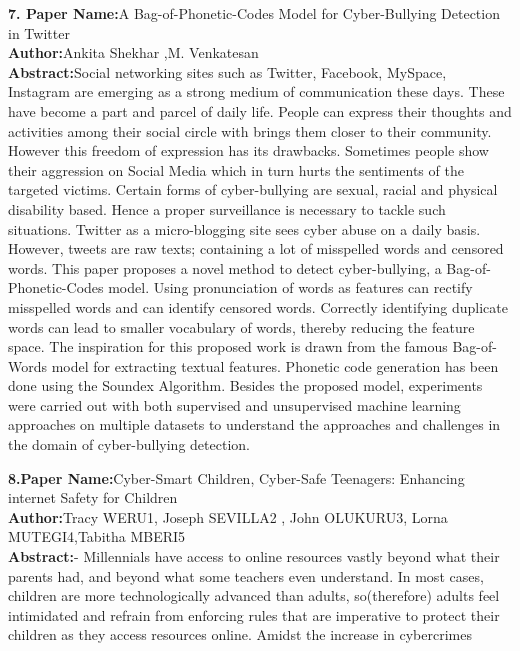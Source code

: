 \documentclass[oneside,a4paper,12pt]{report}
\begin{document}
\newpage
\item \textbf{7. Paper Name:}A Bag-of-Phonetic-Codes Model for Cyber-Bullying Detection in Twitter\\
\textbf{Author:}Ankita Shekhar ,M. Venkatesan\\
\textbf{Abstract:}Social networking sites such as Twitter, Facebook, MySpace, Instagram are emerging as a strong medium of communication these days. These have become a part and parcel of daily life. People can express their thoughts and activities among their social circle with brings them closer to their community. However this freedom of expression has its drawbacks. Sometimes people show their aggression on Social Media which in turn hurts the sentiments of the targeted victims. Certain forms of cyber-bullying are sexual, racial and physical disability based. Hence a proper surveillance is necessary to tackle such situations. Twitter as a micro-blogging site sees cyber abuse on a daily basis. However, tweets are raw texts; containing a lot of misspelled words and censored words. This paper proposes a novel method to detect cyber-bullying, a Bag-of-Phonetic-Codes model. Using pronunciation of words as features can rectify misspelled words and can identify censored words. Correctly identifying duplicate words can lead to smaller vocabulary of words, thereby reducing the feature space. The inspiration for this proposed work is drawn from the famous Bag-of-Words model for extracting textual features. Phonetic code generation has been done using the Soundex Algorithm. Besides the proposed model, experiments were carried out with both supervised and unsupervised machine learning approaches on multiple datasets to understand the approaches and challenges in the domain of cyber-bullying detection. %
\newpage
\item \textbf{8.Paper Name:}Cyber-Smart Children, Cyber-Safe Teenagers:
Enhancing internet Safety for Children\\
\textbf{Author:}Tracy WERU1, Joseph SEVILLA2 , John OLUKURU3,
Lorna MUTEGI4,Tabitha MBERI5\\
\textbf{Abstract:}- Millennials have access to online resources vastly beyond what their
parents had, and beyond what some teachers even understand. In most cases,
children are more technologically advanced than adults, so(therefore) adults feel
intimidated and refrain from enforcing rules that are imperative to protect their
children as they access resources online. Amidst the increase in cybercrimes
\end{document}

